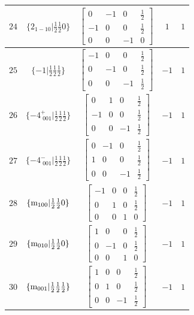 \documentclass[fleqn,8pt]{jsarticle}
\begin{document}
\begin{longtable}{ccccc}
$ 24 $ & $ \{2{}_{1-10}|\frac{1}{2} \frac{1}{2} 0\} $ & $ \begin{bmatrix} 0 & -1 & 0 & \frac{1}{2} \\ -1 & 0 & 0 & \frac{1}{2} \\ 0 & 0 & -1 & 0 \end{bmatrix} $ & $ 1 $ & $ 1 $ \\ \hline
$ 25 $ & $ \{-1|\frac{1}{2} \frac{1}{2} \frac{1}{2}\} $ & $ \begin{bmatrix} -1 & 0 & 0 & \frac{1}{2} \\ 0 & -1 & 0 & \frac{1}{2} \\ 0 & 0 & -1 & \frac{1}{2} \end{bmatrix} $ & $ -1 $ & $ 1 $ \\ \hline
$ 26 $ & $ \{-4^{+}_{\,\,001}|\frac{1}{2} \frac{1}{2} \frac{1}{2}\} $ & $ \begin{bmatrix} 0 & 1 & 0 & \frac{1}{2} \\ -1 & 0 & 0 & \frac{1}{2} \\ 0 & 0 & -1 & \frac{1}{2} \end{bmatrix} $ & $ -1 $ & $ 1 $ \\ \hline
$ 27 $ & $ \{-4^{-}_{\,\,001}|\frac{1}{2} \frac{1}{2} \frac{1}{2}\} $ & $ \begin{bmatrix} 0 & -1 & 0 & \frac{1}{2} \\ 1 & 0 & 0 & \frac{1}{2} \\ 0 & 0 & -1 & \frac{1}{2} \end{bmatrix} $ & $ -1 $ & $ 1 $ \\ \hline
$ 28 $ & $ \{{\rm m}_{100}|\frac{1}{2} \frac{1}{2} 0\} $ & $ \begin{bmatrix} -1 & 0 & 0 & \frac{1}{2} \\ 0 & 1 & 0 & \frac{1}{2} \\ 0 & 0 & 1 & 0 \end{bmatrix} $ & $ -1 $ & $ 1 $ \\ \hline
$ 29 $ & $ \{{\rm m}_{010}|\frac{1}{2} \frac{1}{2} 0\} $ & $ \begin{bmatrix} 1 & 0 & 0 & \frac{1}{2} \\ 0 & -1 & 0 & \frac{1}{2} \\ 0 & 0 & 1 & 0 \end{bmatrix} $ & $ -1 $ & $ 1 $ \\ \hline
$ 30 $ & $ \{{\rm m}_{001}|\frac{1}{2} \frac{1}{2} \frac{1}{2}\} $ & $ \begin{bmatrix} 1 & 0 & 0 & \frac{1}{2} \\ 0 & 1 & 0 & \frac{1}{2} \\ 0 & 0 & -1 & \frac{1}{2} \end{bmatrix} $ & $ -1 $ & $ 1 $ \\ \hline

\end{longtable}
\end{document}
